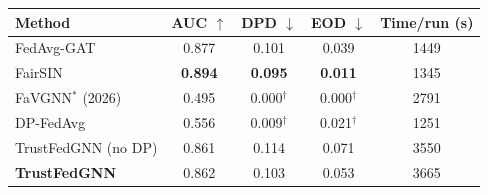 \begin{tabular}{lcccc}
\toprule
Method & AUC $\uparrow$ & DPD $\downarrow$ & EOD $\downarrow$ & Time/run (s) \\
\midrule
FedAvg-GAT & 0.877 & 0.101 & 0.039 & 1449 \\
FairSIN & \textbf{0.894} & \textbf{0.095} & \textbf{0.011} & 1345 \\
FaVGNN$^{\ast}$ (2026) & 0.495 & 0.000$^{\dagger}$ & 0.000$^{\dagger}$ & 2791 \\
DP-FedAvg & 0.556 & 0.009$^{\dagger}$ & 0.021$^{\dagger}$ & 1251 \\
TrustFedGNN (no DP) & 0.861 & 0.114 & 0.071 & 3550 \\
\textbf{TrustFedGNN} & 0.862 & 0.103 & 0.053 & 3665 \\
\bottomrule
\end{tabular}